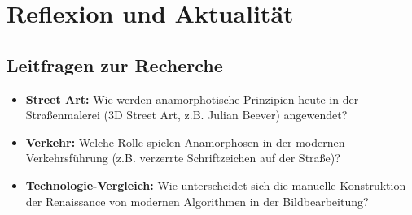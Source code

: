 \section{Reflexion und Aktualität}

\subsection*{Leitfragen zur Recherche}
\begin{itemize}
    \item \textbf{Street Art:} Wie werden anamorphotische Prinzipien heute in der Straßenmalerei (3D Street Art, z.B. Julian Beever) angewendet?
    \item \textbf{Verkehr:} Welche Rolle spielen Anamorphosen in der modernen Verkehrsführung (z.B. verzerrte Schriftzeichen auf der Straße)?
    \item \textbf{Technologie-Vergleich:} Wie unterscheidet sich die manuelle Konstruktion der Renaissance von modernen Algorithmen in der Bildbearbeitung?
\end{itemize}

